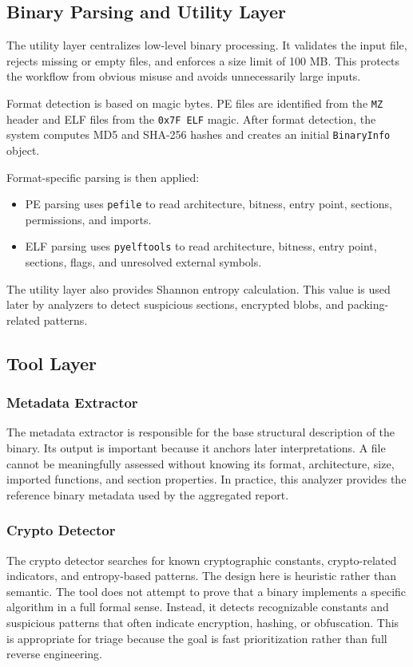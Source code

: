 \documentclass[11pt,a4paper]{article}
\begin{document}
\subsection{Binary Parsing and Utility Layer}
The utility layer centralizes low-level binary processing. It validates the input file, rejects missing or empty files, and enforces a size limit of 100 MB. This protects the workflow from obvious misuse and avoids unnecessarily large inputs.

Format detection is based on magic bytes. PE files are identified from the \texttt{MZ} header and ELF files from the \texttt{0x7F ELF} magic. After format detection, the system computes MD5 and SHA-256 hashes and creates an initial \texttt{BinaryInfo} object.

Format-specific parsing is then applied:

\begin{itemize}
\item PE parsing uses \texttt{pefile} to read architecture, bitness, entry point, sections, permissions, and imports.
\item ELF parsing uses \texttt{pyelftools} to read architecture, bitness, entry point, sections, flags, and unresolved external symbols.
\end{itemize}

The utility layer also provides Shannon entropy calculation. This value is used later by analyzers to detect suspicious sections, encrypted blobs, and packing-related patterns.

\subsection{Tool Layer}
\subsubsection{Metadata Extractor}
The metadata extractor is responsible for the base structural description of the binary. Its output is important because it anchors later interpretations. A file cannot be meaningfully assessed without knowing its format, architecture, size, imported functions, and section properties. In practice, this analyzer provides the reference binary metadata used by the aggregated report.

\subsubsection{Crypto Detector}
The crypto detector searches for known cryptographic constants, crypto-related indicators, and entropy-based patterns. The design here is heuristic rather than semantic. The tool does not attempt to prove that a binary implements a specific algorithm in a full formal sense. Instead, it detects recognizable constants and suspicious patterns that often indicate encryption, hashing, or obfuscation. This is appropriate for triage because the goal is fast prioritization rather than full reverse engineering.
\end{document}
